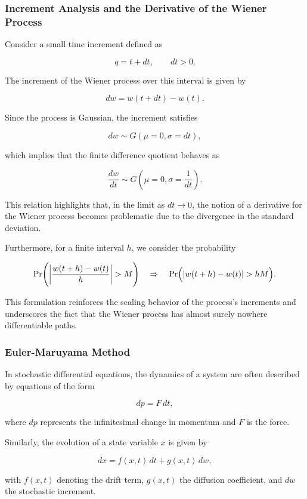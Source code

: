 \newpage

\subsubsection{Increment Analysis and the Derivative of the Wiener Process}

Consider a small time increment defined as

$$
q = t + dt, \quad \quad dt > 0.
$$

The increment of the Wiener process over this interval is given by

$$
dw = w(t+dt) - w(t).
$$

Since the process is Gaussian, the increment satisfies

$$
dw \sim G(\mu = 0, \sigma = dt),
$$

which implies that the finite difference quotient behaves as

$$
\frac{dw}{dt} \sim G\left(\mu = 0, \sigma = \frac{1}{dt}\right).
$$

This relation highlights that, in the limit as $dt\to 0$, the notion of a derivative for the Wiener process becomes problematic due to the divergence in the standard deviation.

Furthermore, for a finite interval $h$, we consider the probability

$$
\Pr\Biggl( \left|\frac{w(t+h)-w(t)}{h} \right| > M \Biggr)
\quad \Rightarrow \quad
\Pr\Bigl( |w(t+h)-w(t)| > hM \Bigr).
$$

This formulation reinforces the scaling behavior of the process's increments and underscores the fact that the Wiener process has almost surely nowhere differentiable paths.

\newpage

\subsubsection{Euler-Maruyama Method}

In stochastic differential equations, the dynamics of a system are often described by equations of the form

$$
\boxed{dp = F\, dt},
$$

where $dp$ represents the infinitesimal change in momentum and $F$ is the force.

Similarly, the evolution of a state variable $x$ is given by

$$
dx = f(x,t)\,dt + g(x,t)\,dw,
$$

with $f(x,t)$ denoting the drift term, $g(x,t)$ the diffusion coefficient, and $dw$ the stochastic increment.

